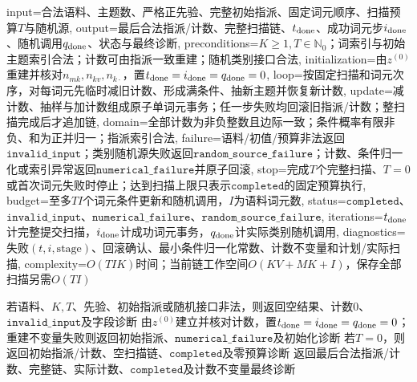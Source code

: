 \begin{AlgorithmContract}{
  input={合法语料、主题数、严格正先验、完整初始指派、固定词元顺序、扫描预算$T$与随机源},
  output={最后合法指派/计数、完整扫描链、$t_{\rm done}$、成功词元步$i_{\rm done}$、随机调用$q_{\rm done}$、状态与最终诊断},
  preconditions={$K\ge1,T\in\mathbb N_0$；词索引与初始主题索引合法；计数可由指派一致重建；随机类别接口合法},
  initialization={由$z^{(0)}$重建并核对$n_{mk},n_{kv},n_{k\cdot}$，置$t_{\rm done}=i_{\rm done}=q_{\rm done}=0$},
  loop={按固定扫描和词元次序，对每词元先临时减旧计数、形成满条件、抽新主题并恢复新计数},
  update={减计数、抽样与加计数组成原子单词元事务；任一步失败均回滚旧指派/计数；整扫描完成后才追加链},
  domain={全部计数为非负整数且边际一致；条件概率有限非负、和为正并归一；指派索引合法},
  failure={语料/初值/预算非法返回$\mathtt{invalid\_input}$；类别随机源失败返回$\mathtt{random\_source\_failure}$；计数、条件归一化或索引异常返回$\mathtt{numerical\_failure}$并原子回滚},
  stop={完成$T$个完整扫描、$T=0$或首次词元失败时停止；达到扫描上限只表示$\mathtt{completed}$的固定预算执行},
  budget={至多$TI$个词元条件更新和随机调用，$I$为语料词元数},
  status={$\mathtt{completed}$、$\mathtt{invalid\_input}$、$\mathtt{numerical\_failure}$、$\mathtt{random\_source\_failure}$},
  iterations={$t_{\rm done}$计完整提交扫描，$i_{\rm done}$计成功词元事务，$q_{\rm done}$计实际类别随机调用},
  diagnostics={失败$(t,i,\mathrm{stage})$、回滚确认、最小条件归一化常数、计数不变量和计划/实际扫描},
  complexity={$O(TIK)$时间；当前链工作空间$O(KV+MK+I)$，保存全部扫描另需$O(TI)$}
}
\begin{algorithm}[tbp]
\caption{LDA折叠Gibbs抽样}\label{alg:V5-C06-gibbs}
若语料、$K,T$、先验、初始指派或随机接口非法，则返回空结果、计数$0$、$\mathtt{invalid\_input}$及字段诊断\;
由$z^{(0)}$建立并核对计数，置$t_{\rm done}=i_{\rm done}=q_{\rm done}=0$；重建不变量失败则返回初始指派、$\mathtt{numerical\_failure}$及初始化诊断\;
若$T=0$，则返回初始指派/计数、空扫描链、$\mathtt{completed}$及零预算诊断\;
返回最后合法指派/计数、完整链、实际计数、$\mathtt{completed}$及计数不变量最终诊断\;
\end{algorithm}
\end{AlgorithmContract}

